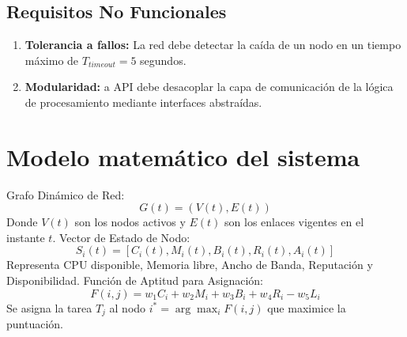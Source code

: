 \documentclass{article}
\begin{document}
    \subsection{Requisitos No Funcionales}
    \begin{enumerate}
        \item \textbf{Tolerancia a fallos:} La red debe detectar la caída de un nodo en un tiempo máximo de $T_{timeout} = 5$ segundos.
        \item \textbf{Modularidad: } a API debe desacoplar la capa de comunicación de la lógica de procesamiento mediante interfaces abstraídas.
    \end{enumerate}
\section{Modelo matemático del sistema}
Grafo Dinámico de Red:
  $$G(t) = (V(t), E(t))$$
Donde $V(t)$ son los nodos activos y $E(t)$ son los enlaces vigentes en el instante $t$.  Vector de Estado de Nodo:
  $$S_i(t) = [C_i(t), M_i(t), B_i(t), R_i(t), A_i(t)]$$
Representa CPU disponible, Memoria libre, Ancho de Banda, Reputación y Disponibilidad.  Función de Aptitud para Asignación:
  $$F(i,j) = w_1 C_i + w_2 M_i + w_3 B_i + w_4 R_i - w_5 L_i$$
Se asigna la tarea $T_j$ al nodo $i^* = \arg\max_i F(i,j)$ que maximice la puntuación.
\end{document}
